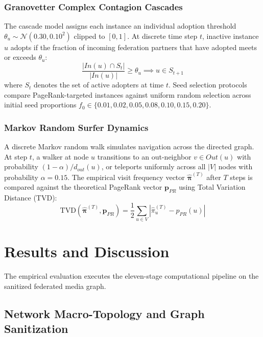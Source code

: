 \documentclass[conference]{IEEEtran}
\begin{document}
\subsubsection{Granovetter Complex Contagion Cascades}
The cascade model assigns each instance an individual adoption threshold $\theta_u \sim \mathcal{N}(0.30, 0.10^2)$ clipped to $[0, 1]$. At discrete time step $t$, inactive instance $u$ adopts if the fraction of incoming federation partners that have adopted meets or exceeds $\theta_u$:
\begin{equation}
    \frac{|In(u) \cap S_t|}{|In(u)|} \ge \theta_u \implies u \in S_{t+1}
    \label{eq:contagion}
\end{equation}
where $S_t$ denotes the set of active adopters at time $t$. Seed selection protocols compare PageRank-targeted instances against uniform random selection across initial seed proportions $f_0 \in \{0.01, 0.02, 0.05, 0.08, 0.10, 0.15, 0.20\}$.

\subsubsection{Markov Random Surfer Dynamics}
A discrete Markov random walk simulates navigation across the directed graph. At step $t$, a walker at node $u$ transitions to an out-neighbor $v \in Out(u)$ with probability $(1 - \alpha) / d_{out}(u)$, or teleports uniformly across all $|V|$ nodes with probability $\alpha = 0.15$. The empirical visit frequency vector $\hat{\boldsymbol{\pi}}^{(T)}$ after $T$ steps is compared against the theoretical PageRank vector $\mathbf{p}_{PR}$ using Total Variation Distance (TVD):
\begin{equation}
    \text{TVD}(\hat{\boldsymbol{\pi}}^{(T)}, \mathbf{p}_{PR}) = \frac{1}{2} \sum_{u \in V} |\hat{\pi}_u^{(T)} - p_{PR}(u)|
    \label{eq:tvd}
\end{equation}

\section{Results and Discussion}

The empirical evaluation executes the eleven-stage computational pipeline on the sanitized federated media graph.

\subsection{Network Macro-Topology and Graph Sanitization}
\end{document}
